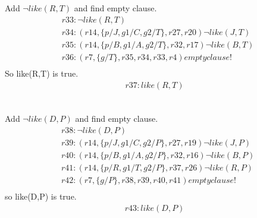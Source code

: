 \documentclass[12pt]{article}
\begin{document}
\subsection{}
Add $ \neg like(R,T) $ and find empty clause.
\begin{align*}
  &r33: \neg like(R,T) \\
  &r34: (r14,\{p/J, g1/C, g2/T\}, r27, r20) \neg like(J,T) \\
  &r35: (r14,\{p/B, g1/A, g2/T\}, r32, r17) \neg like(B,T) \\
  &r36: (r7,\{g/T\}, r35, r34, r33, r4) empty clause! \\
\end{align*}
So like(R,T) is true.
\begin{align*}
  r37: like(R,T) \\
\end{align*}
\subsection{}
Add $ \neg like(D,P)$ and find empty clause.
\begin{align*}
  &r38: \neg like(D,P) \\
  &r39: (r14,\{p/J, g1/C, g2/P\}, r27, r19) \neg like(J,P) \\
  &r40: (r14,\{p/B, g1/A, g2/P\}, r32, r16) \neg like(B,P) \\
  &r41: (r14,\{p/R, g1/T, g2/P\}, r37, r26) \neg like(R,P) \\
  &r42: (r7,\{g/P\}, r38, r39, r40, r41) empty clause! \\
\end{align*}
so like(D,P) is true.
\begin{align*}
  r43: like(D,P)
\end{align*}
\end{document}
